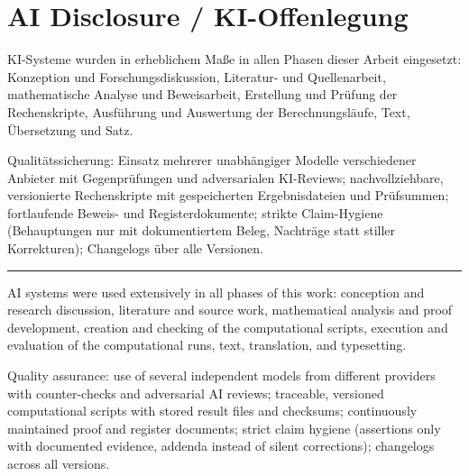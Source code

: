 %
%
%   

\section*{AI Disclosure / KI-Offenlegung}


\noindent
KI-Systeme wurden in erheblichem Ma\ss{}e in allen Phasen dieser Arbeit
eingesetzt: Konzeption und Forschungsdiskussion, Literatur- und
Quellenarbeit, mathematische Analyse und Beweisarbeit, Erstellung und
Pr\"ufung der Rechenskripte, Ausf\"uhrung und Auswertung der
Berechnungsl\"aufe, Text, \"Ubersetzung und Satz.

\medskip

\noindent
Qualit\"atssicherung: Einsatz mehrerer unabh\"angiger Modelle
verschiedener Anbieter mit Gegenpr\"ufungen und adversarialen KI-Reviews;
nachvollziehbare, versionierte Rechenskripte mit gespeicherten
Ergebnisdateien und Pr\"ufsummen; fortlaufende Beweis- und
Registerdokumente; strikte Claim-Hygiene (Behauptungen nur mit
dokumentiertem Beleg, Nachtr\"age statt stiller Korrekturen); Changelogs
\"uber alle Versionen.

\bigskip

\noindent\rule{\textwidth}{0.4pt}

\bigskip


\noindent
AI systems were used extensively in all phases of this work: conception
and research discussion, literature and source work, mathematical analysis
and proof development, creation and checking of the computational scripts,
execution and evaluation of the computational runs, text, translation, and
typesetting.

\medskip

\noindent
Quality assurance: use of several independent models from different
providers with counter-checks and adversarial AI reviews; traceable,
versioned computational scripts with stored result files and checksums;
continuously maintained proof and register documents; strict claim hygiene
(assertions only with documented evidence, addenda instead of silent
corrections); changelogs across all versions.
